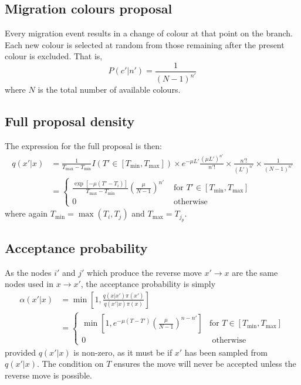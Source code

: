\documentclass[a4paper,11pt]{article}
\begin{document}
\subsection{Migration colours proposal}

Every migration event results in a change of colour at that point on
the branch.  Each new colour is selected at random from those
remaining after the present colour is excluded. That is,
\begin{equation}
  P(c'|n') = \frac{1}{(N-1)^{n'}}
\end{equation}
where $N$ is the total number of available colours.

\subsection{Full proposal density}

The expression for the full proposal is then:
\begin{align}
  q(x'|x) &=\frac{1}{T_{\max}-T_{\min}}I(T'\in[T_{\min},T_{\max}])
  \times e^{-\mu L'}\frac{(\mu L')^{n'}}{n'!}
  \times \frac{n'!}{(L')^{n'}}
  \times \frac{1}{(N-1)^{n'}}\nonumber\\
&=\left\{\begin{array}{rl}
    \frac{\exp[-\mu(T'-T_i)]}{T_{\max}-T_{\min}}\left(\frac{\mu}{N-1}\right)^{n'} &
    \text{ for }T'\in[T_{\min},T_{\max}]\\
    0 & \text{ otherwise}
    \end{array}\right.
\end{align}
where again $T_{\min}=\max(T_i,T_j)$ and $T_{\max}=T_{j_p}$.

\subsection{Acceptance probability}

As the nodes $i'$ and $j'$ which produce the reverse move
$x'\rightarrow x$ are the same nodes used in $x\rightarrow x'$,
the acceptance probability is simply
\begin{align}
  \alpha(x'|x) &=
  \min\left[1,\frac{q(x|x')\pi(x')}{q(x'|x)\pi(x)}\right]\nonumber\\
&=\left\{\begin{array}{cl}
\min\left[1,e^{-\mu(T-T')}\left(\frac{\mu}{N-1}\right)^{n-n'}\right]&\text{
  for }T\in[T_{\min},T_{\max}]\\
0 & \text{ otherwise}\end{array}\right.
\end{align}
provided $q(x'|x)$ is non-zero, as it must be if $x'$ has been sampled
from $q(x'|x)$.  The condition on $T$ ensures the move will never be
accepted unless the reverse move is possible.
\end{document}

